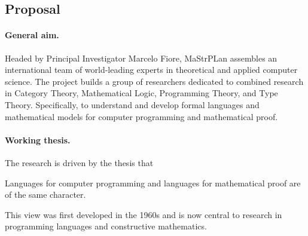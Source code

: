 \documentclass[11pt,twocolumn]{article}
\newenvironment{myquote}
  {\begin{list}{}
  {\setlength{\topsep}{2pt}
   \setlength{\partopsep}{2pt}
   \setlength{\itemsep}{2.5pt}
   \setlength{\parsep}{2.5pt}
   \setlength{\rightmargin}{1em}
   \setlength{\leftmargin}{1em}
   \setlength{\labelwidth}{.5em}}}
  {\end{list}}
\newcommand{\erc}{{\small\sf MaStrPLan}}
\newcommand{\eg}{\emph{eg.}}
\begin{document}
\clearpage
{}

\subsection{Proposal}
\label{Proposal}

\paragraph*{General aim.}

Headed by Principal Investigator Marcelo Fiore, {\erc} assembles an
international team of world-leading experts in theoretical and applied
computer science.  The project builds a group of researchers
dedicated to combined research in Category Theory, Mathematical Logic,
Programming Theory, and Type Theory.  Specifically, to understand and develop
formal languages and mathematical models for computer programming and
mathematical proof. 

\paragraph*{Working thesis.}

The research is driven by the thesis that
\begin{myquote}
\item
Languages 
for computer programming
and languages 
for mathematical proof 
are of the same character.
\end{myquote}
This view %
was first developed in the 1960s %
and is now central to research in programming languages and constructive
mathematics.
\end{document}
